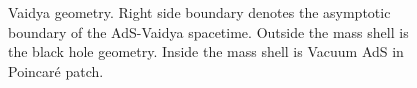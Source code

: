 \documentclass{article}
\begin{document}
\begin{figure}[h]
    \centering
    
    \caption{Vaidya geometry. Right side boundary denotes the asymptotic boundary of the AdS-Vaidya spacetime. Outside the mass shell is the black hole geometry. Inside the mass shell is Vacuum AdS in Poincaré patch.}
    \label{fig:vaidya_geometry}
\end{figure}
\end{document}
